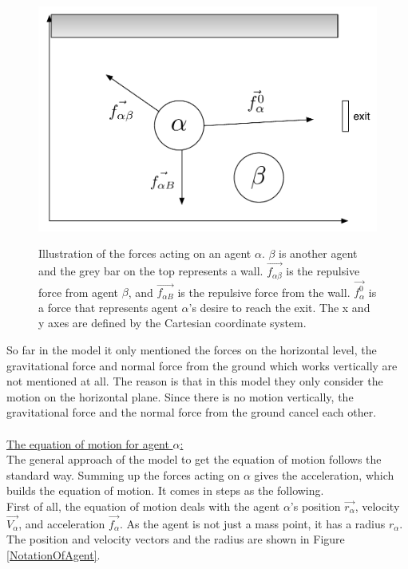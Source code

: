 \begin{figure}[hb]
    \centering
    {\includegraphics[scale=0.45]{Figures/ForceModel.pdf}} 
    \caption[Notation of forces acting on an agent]{Illustration of the forces acting on an agent $ \alpha $. $ \beta $ is another agent and the grey bar on the top represents a wall. $ \vec{f_{\alpha\beta}} $ is the repulsive force from agent $ \beta $, and $ \vec{f_{\alpha B}} $ is the repulsive force from the wall. $ \vec{f^{0}_{\alpha}} $ is a force that represents agent $ \alpha $'s desire to reach the exit.
    The x and y axes are defined by the Cartesian coordinate system.}
    \label{ForceModel}
\end{figure}

So far in the model it only mentioned the forces on the horizontal level, the gravitational force and normal force from the ground which works vertically are not mentioned at all.  The reason is that in this model they only consider the motion on the horizontal plane.  Since there is no motion vertically, the gravitational force and the normal force from the ground cancel each other.\\\\
\underline{The equation of motion for agent $ \alpha $:}\\

The general approach of the model to get the equation of motion follows the standard way. Summing up the forces acting on $ \alpha $ gives the acceleration, which builds the equation of motion. It comes in steps as the following.\\
First of all, the equation of motion deals with the agent $ \alpha $'s position $ \vec{r_{\alpha}} $, velocity $ \vec{V_{\alpha}} $, and acceleration $ \vec{f_{\alpha}} $. As the agent is not just a mass point, it has a radius $ r_{\alpha} $. The position and velocity vectors and the radius are shown in Figure \ref{NotationOfAgent}.

